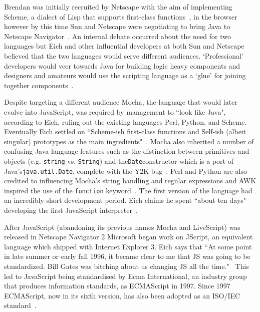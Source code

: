 \documentclass[]{final_report}
\begin{document}
Brendan was initially recruited by Netscape with the aim of implementing Scheme, a dialect of Lisp that supports first-class functions~\cite{dybvig1996scheme}, in the browser however by this time Sun and Netscape were negotiating to bring Java to Netscape Navigator~\cite{popularityofjavascript}. An internal debate occurred about the need for two languages but Eich and other influential developers at both Sun and Netscape believed that the two languages would serve different audiences. `Professional' developers would veer towards Java for building logic heavy components and designers and amateurs would use the scripting language as a `glue' for joining together components~\cite{AZProgrammingLanguages}.

Despite targeting a different audience Mocha, the language that would later evolve into JavaScript, was required by management to ``look like Java", according to Eich, ruling out the existing languages Perl, Python, and Scheme. Eventually Eich settled on ``Scheme-ish first-class functions and Self-ish (albeit singular) prototypes as the main ingredients"~\cite{popularityofjavascript}. Mocha also inherited a number of confusing Java language features such as the distinction between primitives and objects (e.g. \lstinline{string} vs. \lstinline{String}) and the\lstinline{Date}constructor which is a port of Java's\lstinline{java.util.Date}, complete with the Y2K bug~\cite{brendaneichtimetomakejscomment}. Perl and Python are also credited to influencing Mocha's string handling and regular expressions and AWK inspired the use of the \lstinline{function} keyword~\cite{briefhistoryofjavascript}. The first version of the language had an incredibly short development period. Eich claims he spent ``about ten days" developing the first JavaScript interpreter~\cite{AZProgrammingLanguages}.

After JavaScript (abandoning its previous names Mocha and LiveScript) was released in Netscape Navigator 2 Microsoft began work on JScript, an equivalent language which shipped with Internet Explorer 3. Eich says that ``At some point in late summer or early fall 1996, it became clear to me that JS was going to be standardized. Bill Gates was bitching about us changing JS all the time."~\cite{newjavascriptmoduleowner} This led to JavaScript being standardised by Ecma International, an industry group that produces information standards, as ECMAScript in 1997. Since 1997 ECMAScript, now in its sixth version, has also been adopted as an ISO/IEC standard~\cite{ISO/IEC16262:2011}.
\end{document}
